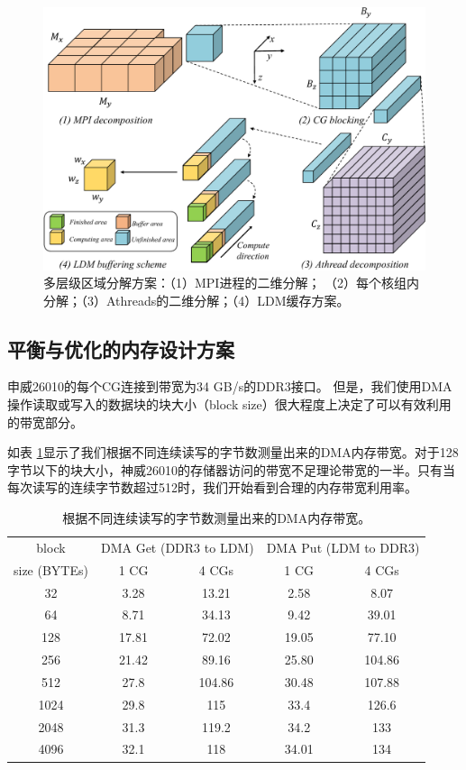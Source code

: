 \documentclass[degree=doctor]{thuthesis}
\begin{document}
\begin{figure}[ht]
\centering
\includegraphics[width=0.9\columnwidth]{blocking.pdf}
\caption{多层级区域分解方案：（1）MPI进程的二维分解； （2）每个核组内分解；（3）Athreads的二维分解；（4）LDM缓存方案。}
\label{fig:dd}
\end{figure}

\subsection{平衡与优化的内存设计方案}
\label{sec:mem-redesign}

申威26010的每个CG连接到带宽为34 GB/s的DDR3接口。 但是，我们使用DMA操作读取或写入的数据块的块大小（block size）很大程度上决定了可以有效利用的带宽部分。

如表 \ref{tb:sw-bw}显示了我们根据不同连续读写的字节数测量出来的DMA内存带宽。对于128字节以下的块大小，神威26010的存储器访问的带宽不足理论带宽的一半。只有当每次读写的连续字节数超过512时，我们开始看到合理的内存带宽利用率。

\begin{table}[!t]
\small
\caption{根据不同连续读写的字节数测量出来的DMA内存带宽。}
\label{tb:sw-bw}
\centering
\begin{tabular}{ccccc}
\hline\hline
  block & \multicolumn{2}{c}{DMA Get (DDR3 to LDM)} & \multicolumn{2}{c}{DMA Put (LDM to DDR3)} \\
  size (BYTEs) & 1 CG & 4 CGs & 1 CG & 4 CGs \\\hline
  32 & 3.28 & 13.21 & 2.58 & 8.07 \\
  64 & 8.71 & 34.13 & 9.42 & 39.01 \\
  128 & 17.81 & 72.02 & 19.05 & 77.10 \\
  256 & 21.42 & 89.16 & 25.80 & 104.86 \\
  512 & 27.8 & 104.86 & 30.48 & 107.88 \\
  1024 & 29.8 & 115 & 33.4 & 126.6 \\
  2048 & 31.3 & 119.2 & 34.2 & 133 \\
  4096 & 32.1 & 118 & 34.01 & 134 \\
  \hline
\end{tabular}
\end{table}
\end{document}
